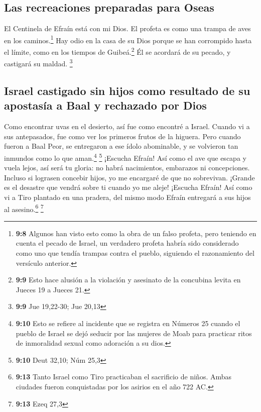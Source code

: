 \hypertarget{las-recreaciones-preparadas-para-oseas}{%
\subsection{Las recreaciones preparadas para
Oseas}\label{las-recreaciones-preparadas-para-oseas}}

 El Centinela de Efraín está con mi Dios. El profeta es
como una trampa de aves en los caminos.\footnote{\textbf{9:8} Algunos
  han visto esto como la obra de un falso profeta, pero teniendo en
  cuenta el pecado de Israel, un verdadero profeta habría sido
  considerado como uno que tendía trampas contra el pueblo, siguiendo el
  razonamiento del versículo anterior.} Hay odio en la casa de su Dios
 porque se han corrompido hasta el límite, como en los
tiempos de Guibeá.\footnote{\textbf{9:9} Esto hace alusión a la
  violación y asesinato de la concubina levita en Jueces 19 a Jueces 21.}
Él se acordará de su pecado, y castigará su maldad. \footnote{\textbf{9:9}
  Jue 19,22-30; Jue 20,13}

\hypertarget{israel-castigado-sin-hijos-como-resultado-de-su-apostasuxeda-a-baal-y-rechazado-por-dios}{%
\subsection{Israel castigado sin hijos como resultado de su apostasía a
Baal y rechazado por
Dios}\label{israel-castigado-sin-hijos-como-resultado-de-su-apostasuxeda-a-baal-y-rechazado-por-dios}}

 Como encontrar uvas en el desierto, así fue como
encontré a Israel. Cuando vi a sus antepasados, fue como ver los
primeros frutos de la higuera. Pero cuando fueron a Baal Peor, se
entregaron a ese ídolo abominable, y se volvieron tan inmundos como lo
que aman.\footnote{\textbf{9:10} Esto se refiere al incidente que se
  registra en Números 25 cuando el pueblo de Israel se dejó seducir por
  las mujeres de Moab para practicar ritos de inmoralidad sexual como
  adoración a su dios.} \footnote{\textbf{9:10} Deut 32,10; Núm 25,3}
 ¡Escucha Efraín! Así como el ave que escapa y vuela
lejos, así será tu gloria: no habrá nacimientos, embarazos ni
concepciones.  Incluso si lograsen concebir hijos, yo me
encargaré de que no sobrevivan. ¡Grande es el desastre que vendrá sobre
ti cuando yo me aleje!  ¡Escucha Efraín! Así como vi a
Tiro plantado en una pradera, del mismo modo Efraín entregará a sus
hijos al asesino.\footnote{\textbf{9:13} Tanto Israel como Tiro
  practicaban el sacrificio de niños. Ambas ciudades fueron conquistadas
  por los asirios en el año 722 AC.} \footnote{\textbf{9:13} Ezeq 27,3}

